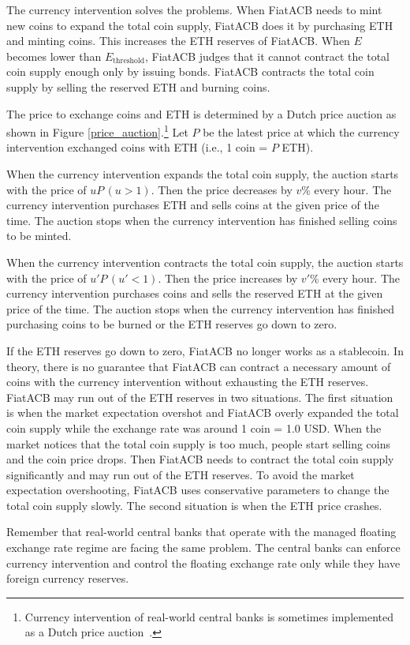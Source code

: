 \documentclass[dvipdfmx,a4paper]{article}
\begin{document}
The currency intervention solves the problems. When FiatACB needs to mint new coins to expand the total coin supply, FiatACB does it by purchasing ETH and minting coins. This increases the ETH reserves of FiatACB. When $E$ becomes lower than $E_{\mathrm{threshold}}$, FiatACB judges that it cannot contract the total coin supply enough only by issuing bonds. FiatACB contracts the total coin supply by selling the reserved ETH and burning coins.

The price to exchange coins and ETH is determined by a Dutch price auction as shown in Figure \ref{price_auction}.\footnote{Currency intervention of real-world central banks is sometimes implemented as a Dutch price auction~\cite{ayuso2003model}.} Let $P$ be the latest price at which the currency intervention exchanged coins with ETH (i.e., 1 coin = $P$ ETH).

When the currency intervention expands the total coin supply, the auction starts with the price of $uP\,(u>1)$. Then the price decreases by $v$\% every hour. The currency intervention purchases ETH and sells coins at the given price of the time. The auction stops when the currency intervention has finished selling coins to be minted.

When the currency intervention contracts the total coin supply, the auction starts with the price of $u'P\,(u'<1)$. Then the price increases by $v'$\% every hour. The currency intervention purchases coins and sells the reserved ETH at the given price of the time. The auction stops when the currency intervention has finished purchasing coins to be burned or the ETH reserves go down to zero.

If the ETH reserves go down to zero, FiatACB no longer works as a stablecoin. In theory, there is no guarantee that FiatACB can contract a necessary amount of coins with the currency intervention without exhausting the ETH reserves. FiatACB may run out of the ETH reserves in two situations. The first situation is when the market expectation overshot and FiatACB overly expanded the total coin supply while the exchange rate was around 1 coin = 1.0 USD. When the market notices that the total coin supply is too much, people start selling coins and the coin price drops. Then FiatACB needs to contract the total coin supply significantly and may run out of the ETH reserves. To avoid the market expectation overshooting, FiatACB uses conservative parameters to change the total coin supply slowly. The second situation is when the ETH price crashes.

Remember that real-world central banks that operate with the managed floating exchange rate regime are facing the same problem. The central banks can enforce currency intervention and control the floating exchange rate only while they have foreign currency reserves.
\end{document}

